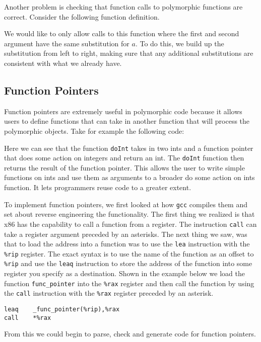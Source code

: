 \documentclass[aps,letterpaper,11pt]{revtex4}
\newcommand{\ttt}[1]{\texttt{#1}}
\begin{document}
Another problem is checking that function calls to polymorphic functions are
correct. Consider the following function definition.\\



We would like to only allow calls to this function where the first and second argument have the same substitution
for $a$. To do this, we build up the substitution from left to right, making sure that any additional 
substitutions are consistent with what we already have.

\subsection{Function Pointers}
Function pointers are extremely useful in polymorphic code because it allows
users to define functions that can take in another function that will process
the polymorphic objects. Take for example the following code:


Here we can see that the function \ttt{doInt} takes in two ints and a
function pointer that does some action on integers and return an int. The
\ttt{doInt} function then returns the result of the function pointer. This
allows the user to write simple functions on ints and use them as arguments
to a broader do some action on ints function. It lets programmers reuse
code to a greater extent.

To implement function pointers, we first looked at how \ttt{gcc} compiles
them and set about reverse engineering the functionality. The first thing we
realized is that x86 has the capability to call a function from a register.
The instruction \ttt{call} can take a register argument preceded by an
asterisks. The next thing we saw, was that to load the address into a function
was to use the \ttt{lea} instruction with the \ttt{\%rip} register. The
exact syntax is to use the name of the function as an offset to \ttt{\%rip}
and use the \ttt{leaq} instruction to store the address of the function into
some register you specify as a destination. Shown in the example below
we load the function \ttt{func\_pointer} into the \ttt{\%rax} register and then
call the function by using the \ttt{call} instruction with the \ttt{\%rax}
register preceded by an asterisk.\\
\begin{lstlisting}
leaq    _func_pointer(%rip),%rax
call    *%rax
\end{lstlisting}
From this we could begin to parse, check and generate code for function
pointers.
\end{document}
